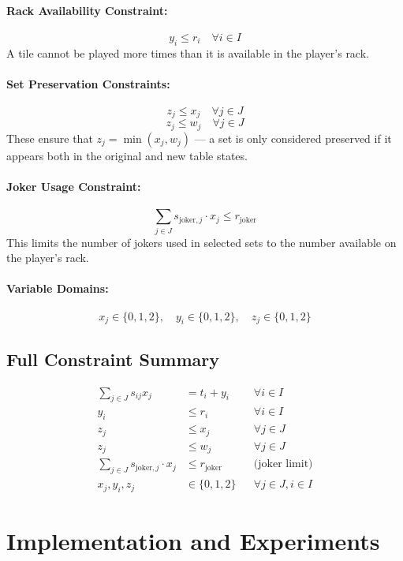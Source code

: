 \documentclass[11pt,letterpaper]{article}
\begin{document}
\paragraph{Rack Availability Constraint:}
\[
y_i \leq r_i \quad \forall i \in I
\]
A tile cannot be played more times than it is available in the player’s rack.

\paragraph{Set Preservation Constraints:}
\[
z_j \leq x_j \quad \forall j \in J
\]
\[
z_j \leq w_j \quad \forall j \in J
\]
These ensure that $z_j = \min(x_j, w_j)$ — a set is only considered preserved if it appears both in the original and new table states.

\paragraph{Joker Usage Constraint:}
\[
\sum_{j \in J} s_{\text{joker}, j} \cdot x_j \leq r_{\text{joker}}
\]
This limits the number of jokers used in selected sets to the number available on the player’s rack.

\paragraph{Variable Domains:}
\[
x_j \in \{0, 1, 2\}, \quad y_i \in \{0, 1, 2\}, \quad z_j \in \{0, 1, 2\}
\]

\subsection*{Full Constraint Summary}
\begin{align*}
\sum_{j \in J} s_{ij} x_j &= t_i + y_i &&\forall i \in I \\
y_i &\leq r_i &&\forall i \in I \\
z_j &\leq x_j &&\forall j \in J \\
z_j &\leq w_j &&\forall j \in J \\
\sum_{j \in J} s_{\text{joker}, j} \cdot x_j &\leq r_{\text{joker}} &&\text{(joker limit)} \\
x_j, y_i, z_j &\in \{0, 1, 2\} &&\forall j \in J, i \in I
\end{align*}


\section*{Implementation and Experiments}
\end{document}
